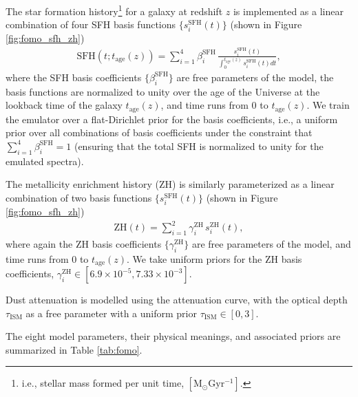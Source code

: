 \documentclass[twocolumn]{aastex62}
\begin{document}
The star formation history\footnote{i.e., stellar mass formed per unit time, $[\mathrm{M}_\odot \mathrm{Gyr^{-1}}]$.} for a galaxy at redshift $z$ is implemented as a linear combination of four SFH basis functions $\{s^\mathrm{SFH}_i(t)\}$ (shown in Figure \ref{fig:fomo_sfh_zh})
\begin{align}
    \mathrm{SFH}(t; t_\mathrm{age}(z)) = \sum_{i=1}^4\beta^\mathrm{SFH}_i\,\frac{s^\mathrm{SFH}_i(t)}{\int_0^{t_\mathrm{age}(z)}s^\mathrm{SFH}_i(t)dt},
\end{align}
where the SFH basis coefficients $\{\beta^\mathrm{SFH}_i\}$ are free parameters of the model, the basis functions are normalized to unity over the age of the Universe at the lookback time of the galaxy $t_\mathrm{age}(z)$, and time runs from $0$ to $t_\mathrm{age}(z)$. We train the emulator over a flat-Dirichlet prior for the basis coefficients, i.e., a uniform prior over all combinations of basis coefficients under the constraint that $\sum_{i=1}^4\beta^\mathrm{SFH}_i=1$ (ensuring that the total SFH is normalized to unity for the emulated spectra).

The metallicity enrichment history (ZH) is similarly parameterized as a linear combination of two basis functions $\{s^\mathrm{SFH}_i(t)\}$ (shown in Figure \ref{fig:fomo_sfh_zh})
\begin{align}
    \mathrm{ZH}(t) = \sum_{i=1}^2\gamma^\mathrm{ZH}_i\,s^\mathrm{ZH}_i(t),
\end{align}
where again the ZH basis coefficients $\{\gamma^\mathrm{ZH}_i\}$ are free parameters of the model, and time runs from $0$ to $t_\mathrm{age}(z)$. We take uniform priors for the ZH basis coefficients, $\gamma^\mathrm{ZH}_i\in[6.9\times 10^{-5}, 7.33\times 10^{-3}]$.

Dust attenuation is modelled using the \citet{calzetti2000} attenuation curve, with the optical depth $\tau_\mathrm{ISM}$ as a free parameter with a uniform prior $\tau_\mathrm{ISM}\in[0,3]$.

The eight model parameters, their physical meanings, and associated priors are summarized in Table \ref{tab:fomo}.
\begin{table}
\centering
{}
\caption{Summary of SPS model parameters and their respective priors for the DESI model (\S \ref{sec:fomo_model}).}
\label{tab:fomo}
\end{table}
%
\end{document}
